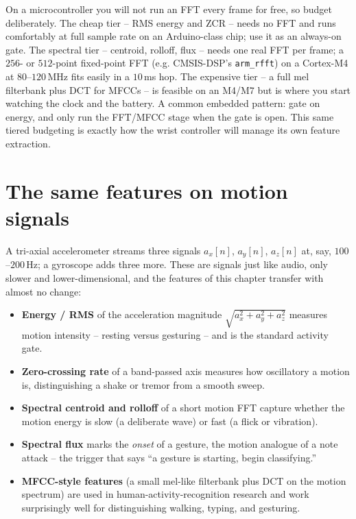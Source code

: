 \begin{buildbox}
On a microcontroller you will not run an FFT every frame for free, so budget
deliberately. The cheap tier -- RMS energy and ZCR -- needs no FFT and runs
comfortably at full sample rate on an Arduino-class chip; use it as an
always-on gate. The spectral tier -- centroid, rolloff, flux -- needs one
real FFT per frame; a $256$- or $512$-point fixed-point FFT (e.g. CMSIS-DSP's
\texttt{arm\_rfft}) on a Cortex-M4 at $80$--$120$\,MHz fits easily in a $10$\,ms
hop. The expensive tier -- a full mel filterbank plus DCT for MFCCs -- is feasible
on an M4/M7 but is where you start watching the clock and the battery. A common
embedded pattern: gate on energy, and only run the FFT/MFCC stage when the gate is
open. This same tiered budgeting is exactly how the wrist controller will manage
its own feature extraction.
\end{buildbox}

\section{The same features on motion signals}
\label{ch27:motion}

A tri-axial accelerometer streams three
signals $a_x[n]$, $a_y[n]$, $a_z[n]$ at, say, $100$--$200$\,Hz; a gyroscope adds three
more. These are signals just like audio, only slower and lower-dimensional, and
the features of this chapter transfer with almost no change:

\begin{itemize}
  \item \textbf{Energy / RMS} of the acceleration magnitude
        $\sqrt{a_x^2+a_y^2+a_z^2}$ measures motion intensity -- resting versus
        gesturing -- and is the standard activity gate.
  \item \textbf{Zero-crossing rate} of a band-passed axis measures how oscillatory
        a motion is, distinguishing a shake or tremor from a smooth sweep.
  \item \textbf{Spectral centroid and rolloff} of a short motion FFT capture
        whether the motion energy is slow (a deliberate wave) or fast (a flick or
        vibration).
  \item \textbf{Spectral flux} marks the \emph{onset} of a gesture, the motion
        analogue of a note attack -- the trigger that says ``a gesture is
        starting, begin classifying.''
  \item \textbf{MFCC-style features} (a small mel-like filterbank plus DCT on the
        motion spectrum) are used in human-activity-recognition research and work
        surprisingly well for distinguishing walking, typing, and gesturing.
\end{itemize}

